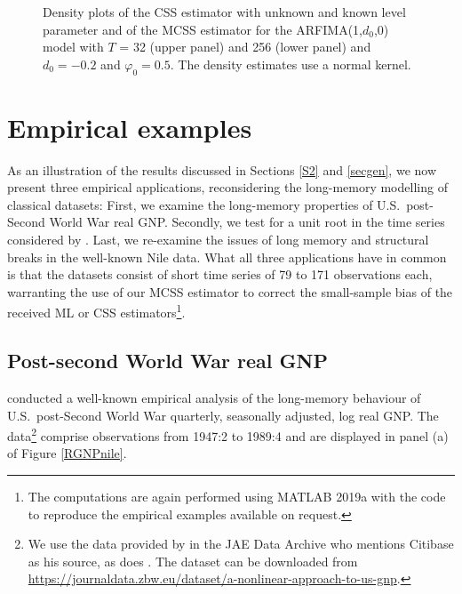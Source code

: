 {{\begin{figure}[H]
\hspace{0mm}
    \caption{ Density plots of the CSS estimator with unknown and known level parameter and of the MCSS estimator for the ARFIMA(1,$d_0$,0) model with $T$ = 32 (upper panel) and 256 (lower panel) and $d_0 = -0.2$ and $\varphi_0 = 0.5$. The density estimates use a normal kernel. }    \label{fig711}\end{figure}




\section{Empirical examples} \label{illustrations}

As an illustration of the results discussed in Sections \ref{S2} and \ref{secgen}, we now present three empirical applications, reconsidering the long-memory modelling of classical datasets: First, we examine the long-memory
properties of U.S.\ post-Second World War real GNP. Secondly, we test for a unit root in the time series considered by \textcite{nelson1982trends}. Last, we re-examine the issues of long memory and structural breaks in the
well-known Nile data. What all three applications have in common is that the datasets consist of short time series of 79 to 171 observations each, warranting the use of our MCSS estimator to correct the small-sample bias of the
received ML or CSS estimators\footnote{The computations are again performed using MATLAB 2019a with the code to reproduce the empirical examples available on request.}.


\subsection{Post-second World War real GNP}
\textcite{sowell1992modeling} conducted a well-known empirical analysis of the long-memory behaviour of U.S.\ post-Second World War quarterly, seasonally adjusted, log real GNP. The data\footnote{We use the data provided by
  \textcite{potter1995nonlinear} in the JAE Data Archive who mentions Citibase as his source, as does \textcite{sowell1992modeling}. The dataset can be downloaded from
  \url{https://journaldata.zbw.eu/dataset/a-nonlinear-approach-to-us-gnp}.} comprise observations from 1947:2 to 1989:4 and are displayed in panel (a) of Figure \ref{RGNPnile}.


}}
